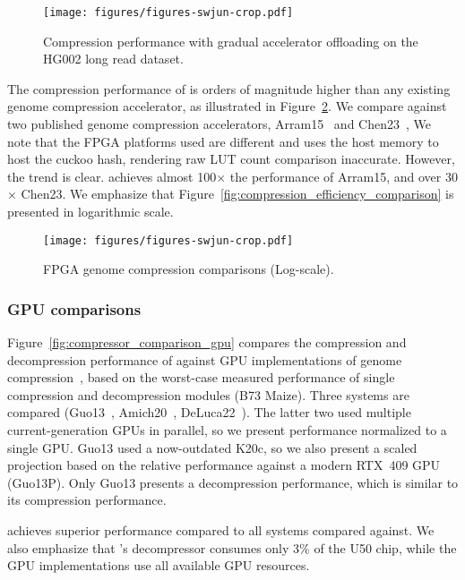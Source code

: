 \begin{figure}[htb]
    \centering
    \texttt{[image: figures/figures-swjun-crop.pdf]}
    \caption{Compression performance with gradual accelerator offloading on the HG002 long read dataset.}
    \label{fig:compression_performance}
\end{figure}

The compression performance of \name{} is orders of magnitude higher than any existing genome compression accelerator, as illustrated in Figure~\ref{fig:compressor_comparison}.
We compare against two published genome compression accelerators, Arram15~\cite{arram2015fpgareferencecompressiongenomic} and Chen23~\cite{chen2023efficientsequencingcompressionfpga},
We note that the FPGA platforms used are different and \name{} uses the host memory to host the cuckoo hash, rendering raw LUT count comparison inaccurate.
However, the trend is clear.
\name{} achieves almost 100$\times$ the performance of Arram15, and over 30$\times$ Chen23.
We emphasize that Figure~\ref{fig:compression_efficiency_comparison} is presented in logarithmic scale.

\begin{figure}[htb]
    \centering
    \texttt{[image: figures/figures-swjun-crop.pdf]}
    \caption{FPGA genome compression comparisons (Log-scale).}
    \label{fig:compressor_comparison}
\end{figure}

\subsubsection{GPU comparisons}
Figure~\ref{fig:compressor_comparison_gpu} compares the compression and decompression performance of \name{} against GPU implementations of genome compression~\cite{guo2013gpu}, based on the worst-case measured performance of single \name{} compression and decompression modules (B73 Maize).
Three systems are compared (Guo13~\cite{guo2013gpu}, Amich20~\cite{amich2020gpu}, DeLuca22~\cite{deluca2022gpu}).
The latter two used multiple current-generation GPUs in parallel, so we present performance normalized to a single GPU.
Guo13 used a now-outdated K20c, so we also present a scaled projection based on the relative performance against a modern RTX~409 GPU (Guo13P).
Only Guo13 presents a decompression performance, which is similar to its compression performance.

\name{} achieves superior performance compared to all systems compared against.
We also emphasize that \name{}'s decompressor consumes only 3\% of the U50 chip, while the GPU implementations use all available GPU resources.

